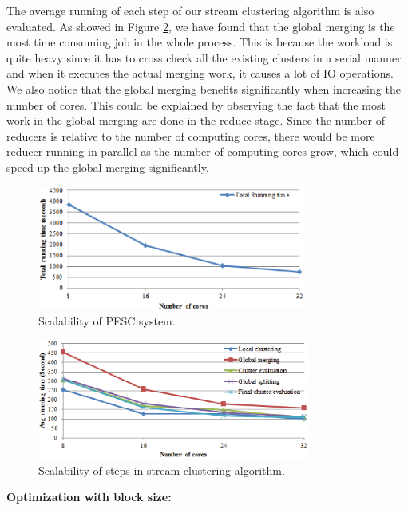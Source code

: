 \documentclass[conference]{IEEEtran}
\begin{document}
The average running of each step of our stream clustering algorithm is also evaluated. As showed in Figure \ref{fig_scalability_phase_cores}, we have found that the global merging is the most time consuming job in the whole process. This is because the workload is quite heavy since it has to cross check all the existing clusters in a serial manner and when it executes the actual merging work, it causes a lot of IO operations. We also notice that the global merging benefits significantly when increasing the number of cores. This could be explained by observing the fact that the most work in the global merging are done in the reduce stage. Since the number of reducers is relative to the number of computing cores, there would be more reducer running in parallel as the number of computing cores grow, which could speed up the global merging significantly.

\begin{figure}[!t]
\centering
\includegraphics[height=1.6in]{./Figure/runningTime_cores.eps}
\caption{Scalability of PESC system.}
\label{fig_scalability_total_cores}
\end{figure}

\begin{figure}[!t]
\centering
\includegraphics[height=1.55in]{./Figure/phase_cores.eps}
\caption{Scalability of steps in stream clustering algorithm.}
\label{fig_scalability_phase_cores}
\end{figure}

\textbf{Optimization with block size: }
\end{document}
